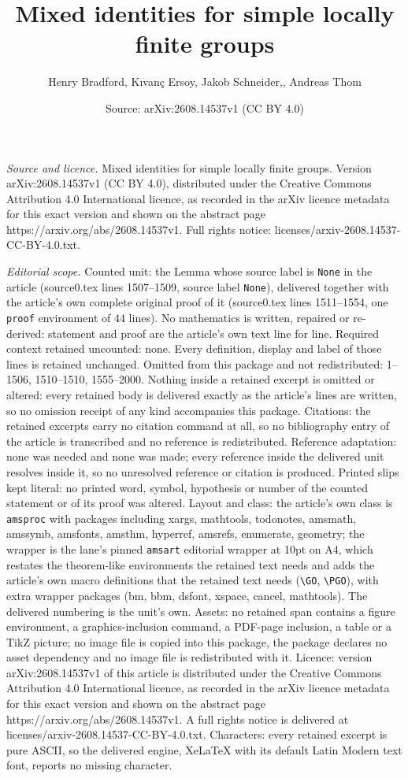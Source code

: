 \documentclass[10pt,a4paper]{amsart}
\title[Mixed identities for simple locally finite groups]{Mixed identities for simple locally finite groups}
\author{Henry Bradford, K{\i}van\c{c} Ersoy, Jakob Schneider,, Andreas Thom}
\date{Source: arXiv:2608.14537v1 (CC BY 4.0)}
\begin{document}
\maketitle

\noindent\emph{Source and licence.} Mixed identities for simple locally finite groups. Version arXiv:2608.14537v1 (CC BY 4.0), distributed under the Creative Commons Attribution 4.0 International licence, as recorded in the arXiv licence metadata for this exact version and shown on the abstract page https://arxiv.org/abs/2608.14537v1. Full rights notice: licenses/arxiv-2608.14537-CC-BY-4.0.txt.\par\smallskip

\noindent\textit{Editorial scope.} Counted unit: the Lemma whose source label is \texttt{None} in the article (source0.tex lines 1507--1509, source label \texttt{None}), delivered together with the article's own complete original proof of it (source0.tex lines 1511--1554, one \texttt{proof} environment of 44 lines). No mathematics is written, repaired or re-derived: statement and proof are the article's own text line for line. Required context retained uncounted: none. Every definition, display and label of those lines is retained unchanged. Omitted from this package and not redistributed: 1--1506, 1510--1510, 1555--2000. Nothing inside a retained excerpt is omitted or altered: every retained body is delivered exactly as the article's lines are written, so no omission receipt of any kind accompanies this package. Citations: the retained excerpts carry no citation command at all, so no bibliography entry of the article is transcribed and no reference is redistributed. Reference adaptation: none was needed and none was made; every reference inside the delivered unit resolves inside it, so no unresolved reference or citation is produced. Printed slips kept literal: no printed word, symbol, hypothesis or number of the counted statement or of its proof was altered. Layout and class: the article's own class is \texttt{amsproc} with packages including xargs, mathtools, todonotes, amsmath, amssymb, amsfonts, amsthm, hyperref, amsrefs, enumerate, geometry; the wrapper is the lane's pinned \texttt{amsart} editorial wrapper at 10pt on A4, which restates the theorem-like environments the retained text needs and adds the article's own macro definitions that the retained text needs (\texttt{\textbackslash GO}, \texttt{\textbackslash PGO}), with extra wrapper packages (bm, bbm, dsfont, xspace, cancel, mathtools). The delivered numbering is the unit's own. Assets: no retained span contains a figure environment, a graphics-inclusion command, a PDF-page inclusion, a table or a TikZ picture; no image file is copied into this package, the package declares no asset dependency and no image file is redistributed with it. Licence: version arXiv:2608.14537v1 of this article is distributed under the Creative Commons Attribution 4.0 International licence, as recorded in the arXiv licence metadata for this exact version and shown on the abstract page https://arxiv.org/abs/2608.14537v1. A full rights notice is delivered at licenses/arxiv-2608.14537-CC-BY-4.0.txt. Characters: every retained excerpt is pure ASCII, so the delivered engine, XeLaTeX with its default Latin Modern text font, reports no missing character.
\end{document}
